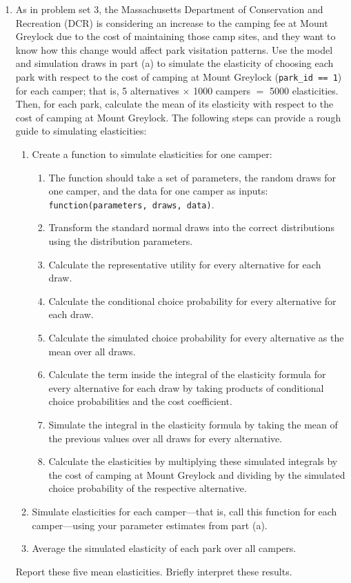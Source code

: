 \documentclass[11pt,letterpaper]{article}
\begin{document}
\begin{enumerate}[label=\alph*., leftmargin=*]
	\item As in problem set 3, the Massachusetts Department of Conservation and Recreation (DCR) is considering an increase to the camping fee at Mount Greylock due to the cost of maintaining those camp sites, and they want to know how this change would affect park visitation patterns. Use the model and simulation draws in part (a) to simulate the elasticity of choosing each park with respect to the cost of camping at Mount Greylock (\texttt{park\_id == 1}) for each camper; that is, 5 alternatives $\times$ 1000 campers $=$ 5000 elasticities. Then, for each park, calculate the mean of its elasticity with respect to the cost of camping at Mount Greylock. The following steps can provide a rough guide to simulating elasticities:
	\begin{enumerate}[label=\Roman*.]
		\item Create a function to simulate elasticities for one camper:
		\begin{enumerate}[label=\roman*.]
			\item The function should take a set of parameters, the random draws for one camper, and the data for one camper as inputs: \texttt{function(parameters, draws, data)}.
			\item Transform the standard normal draws into the correct distributions using the distribution parameters.
			\item Calculate the representative utility for every alternative for each draw.
			\item Calculate the conditional choice probability for every alternative for each draw.
			\item Calculate the simulated choice probability for every alternative as the mean over all draws.
			\item Calculate the term inside the integral of the elasticity formula for every alternative for each draw by taking products of conditional choice probabilities and the cost coefficient.
			\item Simulate the integral in the elasticity formula by taking the mean of the previous values over all draws for every alternative.
			\item Calculate the elasticities by multiplying these simulated integrals by the cost of camping at Mount Greylock and dividing by the simulated choice probability of the respective alternative.
		\end{enumerate}
		\item Simulate elasticities for each camper---that is, call this function for each camper---using your parameter estimates from part (a).
		\item Average the simulated elasticity of each park over all campers.
	\end{enumerate}
	Report these five mean elasticities. Briefly interpret these results.
\end{enumerate}
\end{document}
